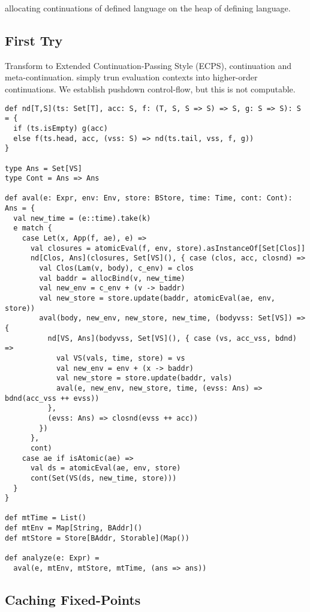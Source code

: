 \documentclass[acmsmall,review,anonymous]{acmart}\settopmatter{printfolios=true,printccs=false,printacmref=false}
\begin{document}
allocating continuations of defined language on the heap of defining language.

\subsection{First Try}

Transform to Extended Continuation-Passing Style (ECPS), continuation and meta-continuation.
simply trun evaluation contexts into higher-order continuations.
We establish pushdown control-flow, but this is not computable.

\begin{lstlisting}
def nd[T,S](ts: Set[T], acc: S, f: (T, S, S => S) => S, g: S => S): S = {
  if (ts.isEmpty) g(acc)
  else f(ts.head, acc, (vss: S) => nd(ts.tail, vss, f, g))
}

type Ans = Set[VS]
type Cont = Ans => Ans

def aval(e: Expr, env: Env, store: BStore, time: Time, cont: Cont): Ans = {
  val new_time = (e::time).take(k)
  e match {
    case Let(x, App(f, ae), e) =>
      val closures = atomicEval(f, env, store).asInstanceOf[Set[Clos]]
      nd[Clos, Ans](closures, Set[VS](), { case (clos, acc, closnd) =>
        val Clos(Lam(v, body), c_env) = clos
        val baddr = allocBind(v, new_time)
        val new_env = c_env + (v -> baddr)
        val new_store = store.update(baddr, atomicEval(ae, env, store)) 
        aval(body, new_env, new_store, new_time, (bodyvss: Set[VS]) => {
          nd[VS, Ans](bodyvss, Set[VS](), { case (vs, acc_vss, bdnd) => 
            val VS(vals, time, store) = vs
            val new_env = env + (x -> baddr)
            val new_store = store.update(baddr, vals)
            aval(e, new_env, new_store, time, (evss: Ans) => bdnd(acc_vss ++ evss))
          },
          (evss: Ans) => closnd(evss ++ acc))
        })
      }, 
      cont)
    case ae if isAtomic(ae) => 
      val ds = atomicEval(ae, env, store)
      cont(Set(VS(ds, new_time, store))) 
  } 
}

def mtTime = List()
def mtEnv = Map[String, BAddr]()
def mtStore = Store[BAddr, Storable](Map())

def analyze(e: Expr) =
  aval(e, mtEnv, mtStore, mtTime, (ans => ans))
\end{lstlisting}

\subsection{Caching Fixed-Points}
\end{document}
